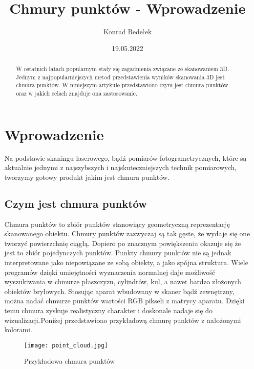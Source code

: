 \documentclass[12pt, a4paper,twocolumn]{article}%
\title{Chmury punktów - Wprowadzenie}
\author{Konrad Bedełek}
\date{19.05.2022}
\begin{document}
	\begin{titlepage}
	\maketitle
	\thispagestyle{empty}
	\end{titlepage}

	\begin{abstract}
	W ostatnich latach popularnym stały się zagadnienia związane ze skanowaniem 3D. Jednym z najpopularniejszych metod przedstawienia wyników skanowania 3D jest chmura punktów. W niniejszym artykule przedstawiono czym jest chmura punktów oraz w jakich celach znajduje ona zastosowanie.
	\end{abstract}

	\section{Wprowadzenie}
	Na podstawie skaningu laserowego, bądź pomiarów fotogrametrycznych, które są aktualnie jednymi z najszybszych i najskuteczniejszych technik pomiarowych, tworzymy gotowy produkt jakim jest chmura punktów.\cite{kowal1}

	\subsection{Czym jest chmura punktów}
	Chmura punktów to zbiór punktów stanowiący geometryczną reprezentację skanowanego obiektu. Chmury punktów zazwyczaj są tak gęste, że wydaje się one tworzyć powierzchnię ciągłą. Dopiero po znacznym powiększeniu okazuje się że jest to zbiór pojedynczych punktów. Punkty chmury punktów nie są jednak interpretowane jako niepowiązane ze sobą obiekty, a jako spójna struktura. Wiele programów dzięki umiejętności wyznaczenia normalnej daje możliwość wyszukiwania w chmurze płaszczyzn, cylindrów, kul, a nawet bardzo złożonych obiektów bryłowych. Stosując aparat wbudowany w skaner bądź zewnętrzny, można nadać chmurze punktów wartości RGB pikseli z matrycy aparatu. Dzięki temu chmura zyskuje realistyczny charakter i doskonale nadaje się do wizualizacji.\linebreak Poniżej przedstawiono przykładową chmurę punktów z nałożonymi kolorami.

	\begin{figure}[h!]%
	\begin{center}%
	\texttt{[image: point\_cloud.jpg]} %
	\caption{Przykładowa chmura punktów}

	\end{center}
	\end{figure}
\end{document}
